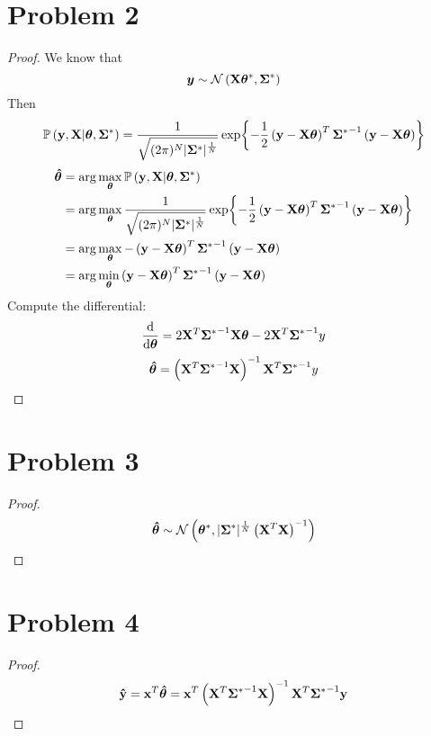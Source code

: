 \documentclass{article}
\begin{document}
\section*{Problem 2}
    \begin{proof}
    We know that $$\vb*{y}\sim \mathcal{N}\left(\vb{X}\bm{\theta}^*, \bm{\Sigma}^*\right)$$ Then
    $$ \mathbb{P}\left(\vb{y},\vb{X}|\bm{\theta},\bm{\Sigma}^*\right)
    =\frac{1}{\sqrt{(2\pi)^N |\bm{\Sigma}^*|^{\frac{1}{N}}}}\exp{-\frac{1}{2}\left(\vb{y}-\vb{X}\bm{\theta}\right)^T{\bm{\Sigma}^*}^{-1}\left(\vb{y}-\vb{X}\bm{\theta}\right)} $$
    \begin{align*}
        \bm{\hat{\theta}} &= \arg{\max_{\bm{\theta}}\mathbb{P}\left(\vb{y},\vb{X}|\bm{\theta},\bm{\Sigma}^*\right)}\\
        &=\arg{\max_{\bm{\theta}}\frac{1}{\sqrt{(2\pi)^N |\bm{\Sigma}^*|^{\frac{1}{N}}}}\exp{-\frac{1}{2}\left(\vb{y}-\vb{X}\bm{\theta}\right)^T{\bm{\Sigma}^*}^{-1}\left(\vb{y}-\vb{X}\bm{\theta}\right)}}\\
        &=\arg{\max_{\bm{\theta}}-\left(\vb{y}-\vb{X}\bm{\theta}\right)^T{\bm{\Sigma}^*}^{-1}\left(\vb{y}-\vb{X}\bm{\theta}\right)}\\
        &=\arg{\min_{\bm{\theta}}\left(\vb{y}-\vb{X}\bm{\theta}\right)^T{\bm{\Sigma}^*}^{-1}\left(\vb{y}-\vb{X}\bm{\theta}\right)}
    \end{align*}
    Compute the differential:
    $$\frac{\text{d}}{\text{d}\bm{\theta}}=2\vb{X}^T {\bm{\Sigma}^*}^{-1} \vb{X}\bm{\theta}-2\vb{X}^T {\bm{\Sigma}^*}^{-1} y$$
    $$\bm{\hat{\theta}} = \left(\vb{X}^T{\bm{\Sigma}^*}^{-1}\vb{X}\right)^{-1}\vb{X}^T {\bm{\Sigma}^*}^{-1} y$$
    \end{proof}

\section*{Problem 3}
    \begin{proof}
        $$\bm{\hat{\theta}} \sim \mathcal{N}\left(\bm{\theta}^*,|\bm{\Sigma}^*|^{\frac{1}{N}}\left(\vb{X}^T\vb{X}\right)^{-1}\right)$$
    \end{proof}

\section*{Problem 4}
    \begin{proof}
        $$\vb{\hat{y}}=\vb{x}^T\bm{\hat{\theta}}=\vb{x}^T\left(\vb{X}^T{\bm{\Sigma}^*}^{-1}\vb{X}\right)^{-1}\vb{X}^T{\bm{\Sigma}^*}^{-1}\vb{y}$$
    \end{proof}
\end{document}
